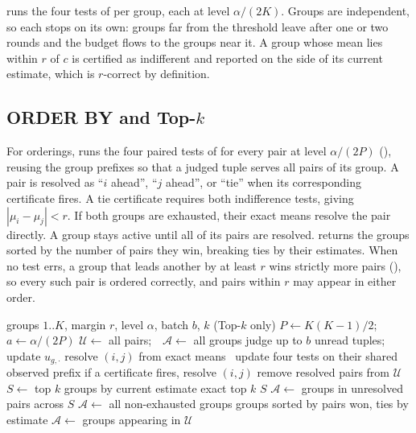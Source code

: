  runs the four tests of  per group, each at level $\alpha/(2K)$.
Groups are independent, so each stops on its own: groups far from the threshold leave after one or two rounds and the budget flows to the groups near it.
A group whose mean lies within $r$ of $c$ is certified as indifferent and reported on the side of its current estimate, which is $r$-correct by definition.

\subsection{\texorpdfstring{ORDER BY and Top-$k$}{ORDER BY and Top-k}}

For orderings, \sys{} runs the four paired tests of  for every pair at level $\alpha/(2P)$ (), reusing the group prefixes so that a judged tuple serves all pairs of its group.
A pair is resolved as ``$i$ ahead'', ``$j$ ahead'', or ``tie'' when its corresponding certificate fires. A tie certificate requires both indifference tests, giving $|\mu_i-\mu_j|<r$. If both groups are exhausted, their exact means resolve the pair directly.
A group stays active until all of its pairs are resolved.
\sys{} returns the groups sorted by the number of pairs they win, breaking ties by their estimates.
When no test errs, a group that leads another by at least $r$ wins strictly more pairs (), so every such pair is ordered correctly, and pairs within $r$ may appear in either order.

\begin{algorithm}[t]
\caption{\sys{} for ORDER BY and Top-$k$}
\label{alg:order}
\begin{algorithmic}[1]
\Require groups $1..K$, margin $r$, level $\alpha$, batch $b$, $k$ (Top-$k$ only)
\State $P\gets K(K-1)/2$;\ \ $a\gets\alpha/(2P)$
\State $\mathcal{U}\gets$ all pairs;\ \ $\mathcal{A}\gets$ all groups
   judge up to $b$ unread tuples; update $u_{g,\cdot}$ \EndFor
     resolve $(i,j)$ from exact means
    \Else\ update four tests on their shared observed prefix
      \State if a certificate fires, resolve $(i,j)$
    \EndIf
  \EndFor
  \State remove resolved pairs from $\mathcal{U}$
   $S\gets$ top $k$ groups by current estimate
     \Return exact top $k$ \EndIf
     \Return $S$ \EndIf
    \State $\mathcal{A}\gets$ groups in unresolved pairs across $S$
     $\mathcal{A}\gets$ all non-exhausted groups \EndIf
  \Else
     \Return groups sorted by pairs won, ties by estimate \EndIf
    \State $\mathcal{A}\gets$ groups appearing in $\mathcal{U}$
  \EndIf
\EndWhile
\end{algorithmic}
\end{algorithm}

